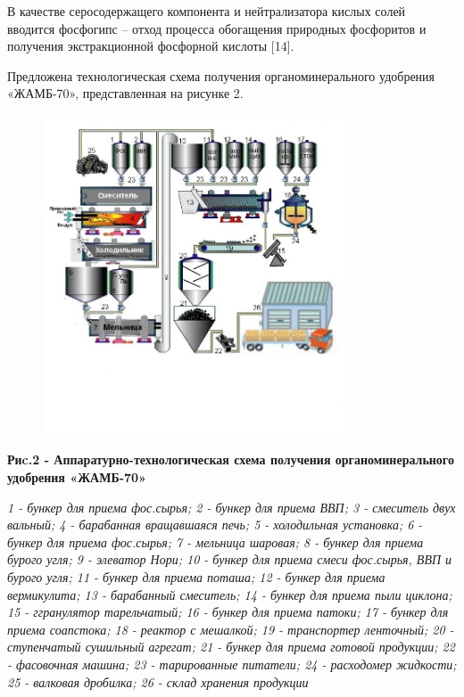 В качестве серосодержащего компонента и нейтрализатора кислых солей
вводится фосфогипс -- отход процесса обогащения природных фосфоритов и
получения экстракционной фосфорной кислоты {[}14{]}.

Предложена технологическая схема получения органоминерального удобрения
«ЖАМБ-70», представленная на рисунке 2.

\begin{figure}[H]
	\centering
	\includegraphics[width=0.8\textwidth]{assets/1081}
	\caption*{}
\end{figure}

\textbf{Риc.2 - Аппаратурно-технологическая схема получения
органоминерального удобрения «ЖАМБ-70»}

\emph{1 - бункер для приема фос.сырья; 2 - бункер для приема ВВП; 3 -
смеситель двух вальный; 4 - барабанная вращавшаяся печь; 5 - холодильная
установка; 6 - бункер для приема фос.сырья; 7 - мельница шаровая; 8 -
бункер для приема бурого угля; 9 - элеватор Нори; 10 - бункер для приема
смеси фос.сырья, ВВП и бурого угля; 11 - бункер для приема поташа; 12 -
бункер для приема вермикулита; 13 - барабанный смеситель; 14 - бункер
для приема пыли циклона; 15 - ггранулятор тарельчатый; 16 - бункер для
приема патоки; 17 - бункер для приема соапстока; 18 - реактор с
мешалкой; 19 - транспортер ленточный; 20 - ступенчатый сушильный
агрегат; 21 - бункер для приема готовой продукции; 22 - фасовочная
машина; 23 - тарированные питатели; 24 - расходомер жидкости; 25 -
валковая дробилка; 26 - склад хранения продукции}

